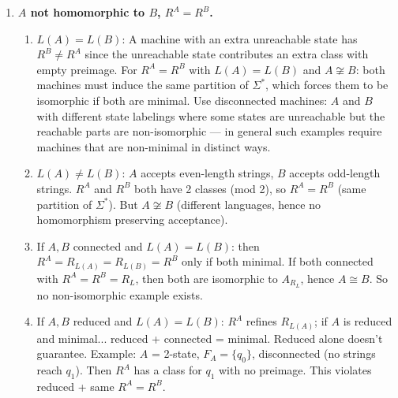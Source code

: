 \begin{enumerate}[{3.}1.]
\begin{enumerate}
\item Via Exercise 3.35: an isomorphism $\mu: A\to B$ is in particular a homomorphism, so $R^A$ refines $R^B$ (Exercise 3.35). By symmetry ($\mu^{-1}: B\to A$ is also a homomorphism), $R^B$ refines $R^A$. So $R^A=R^B$.

\item Directly: $x\,R^A\,y\Leftrightarrow\DBAR_A(s_0,x)=\DBAR_A(s_0,y)\Leftrightarrow\mu(\DBAR_A(s_0,x))=\mu(\DBAR_A(s_0,y))$ ($\mu$ injective) $\Leftrightarrow\DBAR_B(s_0,x)=\DBAR_B(s_0,y)$ (Exercise 3.10) $\Leftrightarrow x\,R^B\,y$.
\end{enumerate}

\item \textbf{$A$ not homomorphic to $B$, $R^A=R^B$.}

\begin{enumerate}
\item $L(A)=L(B)$: A machine with an extra unreachable state has $R^B\neq R^A$ since the unreachable state contributes an extra class with empty preimage. For $R^A=R^B$ with $L(A)=L(B)$ and $A\not\cong B$: both machines must induce the same partition of $\Sigma^*$, which forces them to be isomorphic if both are minimal. Use disconnected machines: $A$ and $B$ with different state labelings where some states are unreachable but the reachable parts are non-isomorphic — in general such examples require machines that are non-minimal in distinct ways.

\item $L(A)\neq L(B)$: $A$ accepts even-length strings, $B$ accepts odd-length strings. $R^A$ and $R^B$ both have 2 classes (mod 2), so $R^A=R^B$ (same partition of $\Sigma^*$). But $A\not\cong B$ (different languages, hence no homomorphism preserving acceptance).

\item If $A,B$ connected and $L(A)=L(B)$: then $R^A=R_{L(A)}=R_{L(B)}=R^B$ only if both minimal. If both connected with $R^A=R^B=R_L$, then both are isomorphic to $A_{R_L}$, hence $A\cong B$. So no non-isomorphic example exists.

\item If $A,B$ reduced and $L(A)=L(B)$: $R^A$ refines $R_{L(A)}$; if $A$ is reduced and minimal... reduced + connected = minimal. Reduced alone doesn't guarantee. Example: $A$ = 2-state, $F_A=\{q_0\}$, disconnected (no strings reach $q_1$). Then $R^A$ has a class for $q_1$ with no preimage. This violates reduced + same $R^A=R^B$.
\end{enumerate}


\end{enumerate}
